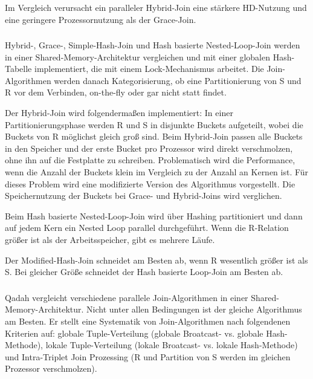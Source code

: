 \documentclass[a4paper,12pt,twoside]{article}
\begin{document}
Im Vergleich verursacht ein paralleler Hybrid-Join eine stärkere HD-Nutzung und eine geringere Prozessornutzung als der Grace-Join.

\subsubsection*{}

Hybrid-, Grace-, Simple-Hash-Join und Hash basierte Nested-Loop-Join werden in einer Shared-Memory-Architektur vergleichen und mit einer globalen Hash-Tabelle implementiert, die mit einem Lock-Mechanismus arbeitet. Die Join-Algorithmen werden danach Kategorisierung, ob eine Partitionierung von S und R vor dem Verbinden, on-the-fly oder gar nicht statt findet. 

Der Hybrid-Join wird folgendermaßen implementiert: In einer Partitionierungsphase werden R und S in disjunkte Buckets aufgeteilt, wobei die Buckets von R möglichst gleich groß sind. Beim Hybrid-Join passen alle Buckets in den Speicher und der erste Bucket pro Prozessor wird direkt verschmolzen, ohne ihn auf die Festplatte zu schreiben. Problematisch wird die Performance, wenn die Anzahl der Buckets klein im Vergleich zu der Anzahl an Kernen ist. Für dieses Problem wird eine modifizierte Version des Algorithmus vorgestellt. Die Speichernutzung der Buckets bei Grace- und Hybrid-Joins wird verglichen.

Beim Hash basierte Nested-Loop-Join wird über Hashing partitioniert und dann auf jedem Kern ein Nested Loop parallel durchgeführt. Wenn die R-Relation größer ist als der Arbeitsspeicher, gibt es mehrere Läufe.

Der Modified-Hash-Join schneidet am Besten ab, wenn R wesentlich größer ist als S. Bei gleicher Größe schneidet der Hash basierte Loop-Join am Besten ab.

\subsubsection*{}

Qadah vergleicht verschiedene parallele Join-Algorithmen in einer Shared-Memory-Architektur. Nicht unter allen Bedingungen ist der gleiche Algorithmus am Besten. Er stellt eine Systematik von Join-Algorithmen nach folgendenen Kriterien auf: globale Tuple-Verteilung (globale Broatcast- vs. globale Hash-Methode), lokale Tuple-Verteilung (lokale Broatcast- vs. lokale Hash-Methode) und Intra-Triplet Join Prozessing (R und Partition von S werden im gleichen Prozessor verschmolzen). 
\end{document}
